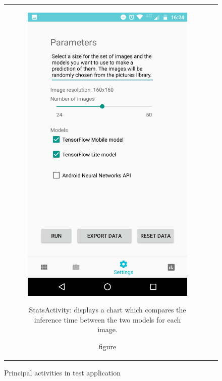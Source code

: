 \documentclass{article}
\begin{document}
\begin{figure}[!h]
\begin{tabular}[c]{cc}
\begin{subfigure}[c]{0.4\textwidth}
      \includegraphics[width=\textwidth]{img/app/settings.png}
      \caption{figure}{\footnotesize StatsActivity: displays a chart which compares the inference time between the two models for each image.}
      \label{fig:StatsActivity}
    \end{subfigure}\\
  \end{tabular}    
  \caption{\footnotesize Principal activities in test application}
  \label{fig:Activities}
\end{figure}

\newpage 
\end{document}
